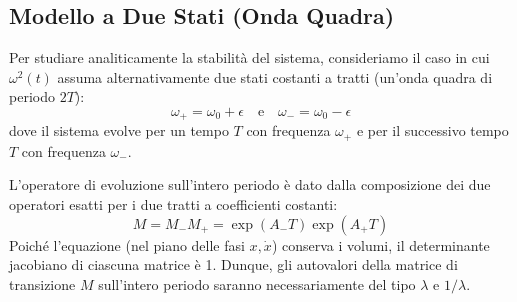 \documentclass[12pt,a4paper]{article}
\begin{document}
\subsection{Modello a Due Stati (Onda Quadra)}
Per studiare analiticamente la stabilità del sistema, consideriamo il caso in cui $\omega^2(t)$ assuma alternativamente due stati costanti a tratti (un'onda quadra di periodo $2T$):
\begin{equation}
\omega_+ = \omega_0 + \epsilon \quad \text{e} \quad \omega_- = \omega_0 - \epsilon
\end{equation}
dove il sistema evolve per un tempo $T$ con frequenza $\omega_+$ e per il successivo tempo $T$ con frequenza $\omega_-$. 

L'operatore di evoluzione sull'intero periodo è dato dalla composizione dei due operatori esatti per i due tratti a coefficienti costanti:
\begin{equation}
M = M_- M_+ = \exp(A_- T) \exp(A_+ T)
\end{equation}
Poiché l'equazione (nel piano delle fasi $x, \dot{x}$) conserva i volumi, il determinante jacobiano di ciascuna matrice è 1. Dunque, gli autovalori della matrice di transizione $M$ sull'intero periodo saranno necessariamente del tipo $\lambda$ e $1/\lambda$.
\end{document}
